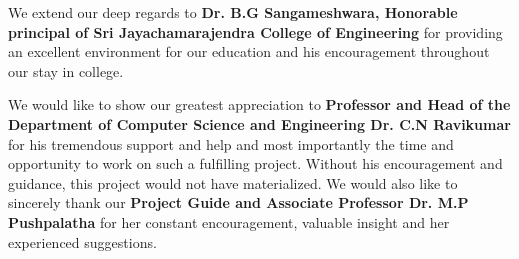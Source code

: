 \documentclass[11pt,a4paper]{report}
\begin{document}
{\justifying
\setlength{\parindent}{1cm}
We extend our deep regards to \textbf{Dr. B.G Sangameshwara, Honorable principal of Sri Jayachamarajendra College of Engineering} for providing an excellent environment for our education and his encouragement throughout our stay in college.\\
}

{\justifying
\setlength{\parindent}{1cm}
We would like to show our greatest appreciation to \textbf{Professor and Head of the Department of Computer Science and Engineering Dr. C.N Ravikumar} for his tremendous support and help and most importantly the time and opportunity to work on such a fulfilling project. Without his encouragement and guidance, this project would not have materialized. We would also like to sincerely thank our \textbf{Project Guide and Associate Professor Dr. M.P Pushpalatha} for her constant encouragement, valuable insight and her experienced suggestions.\\}
\end{document}
